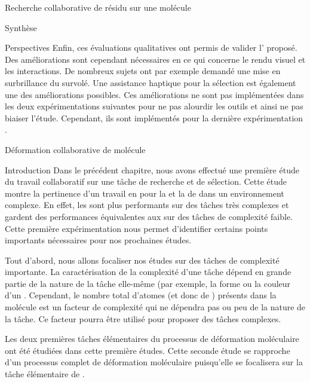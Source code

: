 \documentclass[myfrancais]{mythesis}
\begin{document}
\begin{mychapter}{Recherche collaborative de résidu sur une molécule}
\begin{mysection}{Synthèse}
\begin{mysubsection}{Perspectives}
				Enfin, ces évaluations qualitatives ont permis de valider l' proposé.
				Des améliorations sont cependant nécessaires en ce qui concerne le rendu visuel et les interactions.
				De nombreux sujets ont par exemple demandé une mise en surbrillance du  survolé.
				Une assistance haptique pour la sélection est également une des améliorations possibles.
				Ces améliorations ne sont pas implémentées dans les deux expérimentations suivantes pour ne pas alourdir les outils et ainsi ne pas biaiser l'étude.
				Cependant, ils sont implémentés pour la dernière expérimentation .
			\end{mysubsection}
		\end{mysection}
	\end{mychapter}
	\begin{mychapter}{Déformation collaborative de molécule}
		\begin{mysection}{Introduction}
			Dans le précédent chapitre, nous avons effectué une première étude du travail collaboratif sur une tâche de recherche et de sélection.
			Cette étude montre la pertinence d'un travail en  pour la  et la  de  dans un environnement complexe.
			En effet, les  sont plus performants sur des tâches très complexes et gardent des performances équivalentes aux  sur des tâches de complexité faible.
			Cette première expérimentation nous permet d'identifier certains points importants nécessaires pour nos prochaines études.

			Tout d'abord, nous allons focaliser nos études sur des tâches de complexité importante.
			La caractérisation de la complexité d'une tâche dépend en grande partie de la nature de la tâche elle-même (par exemple, la forme ou la couleur d'un .
			Cependant, le nombre total d'atomes (et donc de ) présents dans la molécule est un facteur de complexité qui ne dépendra pas ou peu de la nature de la tâche.
			Ce facteur pourra être utilisé pour proposer des tâches complexes.

			Les deux premières tâches élémentaires du processus de déformation moléculaire  ont été étudiées dans cette première études.
			Cette seconde étude se rapproche d'un processus complet de déformation moléculaire puisqu'elle se focalisera sur la tâche élémentaire de .


\end{mysection}
\end{mychapter}
\end{document}
